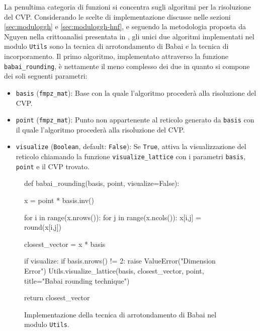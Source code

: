 La penultima categoria di funzioni si concentra sugli algoritmi per la risoluzione del 
CVP. Considerando le scelte di implementazione discusse nelle sezioni \ref{sec:moduloggh}
 e \ref{sec:moduloggh-hnf}, e seguendo la metodologia proposta da Nguyen nella crittoanalisi 
presentata in 
\cite{Nguyen99}, gli unici due algoritmi implementati nel modulo \texttt{Utils} 
sono la tecnica di arrotondamento di Babai e la tecnica di incorporamento. Il primo 
algoritmo, implementato attraverso la funzione \texttt{babai\_rounding},
è nettamente il meno complesso dei due in quanto si compone dei soli seguenti parametri:
\begin{itemize}
    \item \texttt{basis} (\texttt{fmpz\_mat}): Base con la quale l'algoritmo procederà 
    alla risoluzione del CVP. 
    \item \texttt{point} (\texttt{fmpz\_mat}): Punto non appartenente al reticolo generato 
    da \texttt{basis} con il quale l'algoritmo procederà alla risoluzione del CVP.
    \item \texttt{visualize} (\texttt{Boolean}, default: \texttt{False}):
    Se \texttt{True}, attiva la visualizzazione del reticolo chiamando la funzione 
    \texttt{visualize\_lattice} con i parametri \texttt{basis}, \texttt{point} e il CVP trovato.
\end{itemize}

\begin{figure}[h]
    \begin{python}
        def babai_rounding(basis, point, visualize=False):

            x = point * basis.inv()

            for i in range(x.nrows()):
                for j in range(x.ncols()):
                    x[i,j] = round(x[i,j])
            
            closest_vector = x * basis  

            if visualize:
                if basis.nrows() != 2:
                    raise ValueError("Dimension Error")
                Utils.visualize_lattice(basis, closest_vector, 
                    point, title="Babai rounding technique")
                
            return closest_vector
    \end{python}
    \caption[Tecnica di arrotondamento di Babai nel modulo \texttt{Utils}.]
    {Implementazione della tecnica di arrotondamento di Babai nel modulo \texttt{Utils}.}
    \label{fig:utilsbabai}
\end{figure}


